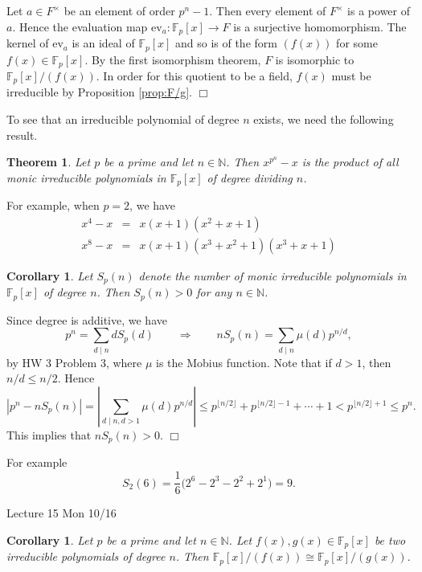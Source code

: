 \documentclass{article}
\def\F{{\mathbb F}}
\def\N{{\mathbb N}}
\def\F{{\mathbb F}}
\newtheorem{theorem}[subsection]{Theorem}
\newtheorem{cor}[subsection]{Corollary}
\newenvironment{proof}{\noindent {\bf Proof:}}{$\Box$ \vspace{2 ex}}
\newcommand{\add}[1]{{\color{blue} #1}}
\begin{document}
\begin{proof}
    Let $a\in F^\times$ be an element of order $p^n - 1$. Then every element of $F^\times$ is a power of $a$. Hence the evaluation map $\text{ev}_a:\F_p[x] \rightarrow F$ is a surjective homomorphism. The kernel of $\text{ev}_a$ is an ideal of $\F_p[x]$ and so is of the form $(f(x))$ for some $f(x)\in\F_p[x]$. By the first isomorphism theorem, $F$ is isomorphic to $\F_p[x]/(f(x))$. In order for this quotient to be a field, $f(x)$ must be irreducible by Proposition \ref{prop:F/g}.
\end{proof}

To see that an irreducible polynomial of degree $n$ exists, we need the following result.

\begin{theorem}\label{thm:fact}
    Let $p$ be a prime and let $n\in\N$. Then $x^{p^n}-x$ is the product of all monic irreducible polynomials in $\F_p[x]$ of degree dividing $n$.
\end{theorem}

For example, when $p = 2$, we have
\begin{eqnarray*}
    x^4 - x &=& x(x + 1)(x^2 + x + 1)\\
    x^8 - x &=& x(x + 1)(x^3 + x^2 + 1)(x^3 + x + 1)
\end{eqnarray*}

\begin{cor}
    Let $S_p(n)$ denote the number of monic irreducible polynomials in $\F_p[x]$ of degree $n$. Then $S_p(n)>0$ for any $n\in\N$.
\end{cor}

\begin{proof}
 Since degree is additive, we have 
$$p^n = \sum_{d\mid n}dS_p(d) \qquad\Longrightarrow\qquad nS_p(n) = \sum_{d\mid n}\mu(d)p^{n/d},$$
by HW 3 Problem 3, where $\mu$ is the Mobius function.
Note that if $d>1$, then $n/d \leq n/2$. Hence
$$|p^n - nS_p(n)|  = \left|\sum_{d\mid n,d>1} \mu(d)p^{n/d}\right| \leq p^{\lfloor n/2\rfloor} + p^{\lfloor n/2\rfloor-1} + \cdots + 1 < p^{\lfloor n/2\rfloor+1} \leq p^n.$$
This implies that $nS_p(n) > 0$.
\end{proof}

For example
$$S_2(6) = \frac{1}{6}\Big(2^6 - 2^3 - 2^2 + 2^1\Big) = 9.$$

\begin{center}
    \add{Lecture 15 Mon 10/16}
\end{center}

\begin{cor}\label{cor:iso}
    Let $p$ be a prime and let $n\in\N$. Let $f(x),g(x)\in\F_p[x]$ be two irreducible polynomials of degree $n$. Then $\F_p[x]/(f(x))\cong \F_p[x]/(g(x)).$
\end{cor}
\end{document}
